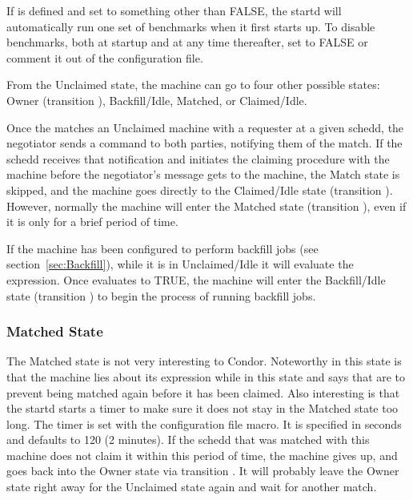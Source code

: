 \Note If  is defined and set to something
other than FALSE, the startd will automatically run one set of
benchmarks when it first starts up.
To disable benchmarks, both at startup and at any time thereafter,
set  to FALSE or comment it out of the
configuration file.

From the Unclaimed state, the machine can go to four other possible
states: Owner (transition ), Backfill/Idle, Matched, or
Claimed/Idle.

Once the  matches an Unclaimed machine with a
requester at a given schedd, the negotiator sends a command to both
parties, notifying them of the match.  
If the schedd receives that notification and initiates the claiming
procedure with the machine before the negotiator's message gets to the
machine, the Match state is skipped,
and the machine goes
directly to the Claimed/Idle state (transition ).
However, normally the machine will enter the Matched state (transition
), even if it is only for a brief period of time.

If the machine has been configured to perform backfill jobs (see
section~\ref{sec:Backfill}), while it is in Unclaimed/Idle it will
evaluate the  expression.
Once  evaluates to TRUE, the machine will enter
the Backfill/Idle state (transition ) to begin the process of
running backfill jobs.


\subsubsection{\label{sec:Matched-State}Matched State}

The Matched state is not very interesting to Condor.
Noteworthy in this state is that the machine lies about its 
expression while in this state and says that  are
 to prevent being matched again before it has been claimed.
Also interesting is that
the startd starts a timer to make sure it does not stay in the
Matched state too long.
The timer is set with the 
\label{param:MatchTimeout} configuration file macro.
It is specified in seconds and defaults to 120 (2 minutes).
If the schedd that was matched with this machine does not
claim it within this period of time, the machine gives up,
and goes back into the Owner state via transition .
It will probably leave the Owner state right away for the
Unclaimed state again and wait for another match. 

